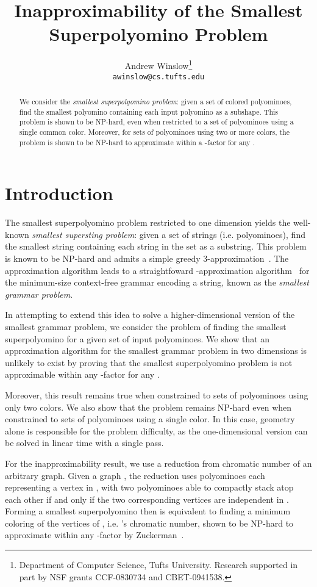 \documentclass{article}
\author{Andrew Winslow\footnote{Department of Computer Science, Tufts University. Research supported in part by NSF grants CCF-0830734 and CBET-0941538.}\\
\texttt{awinslow@cs.tufts.edu}}
\title{Inapproximability of the Smallest Superpolyomino Problem}
\date{}
\newcommand{\ccNP}{\textrm{\textsc{NP}}}
\begin{document}
\maketitle

\begin{abstract}
We consider the \emph{smallest superpolyomino problem}: given a set of colored polyominoes, find the smallest polyomino containing each input polyomino as a subshape.
This problem is shown to be \ccNP-hard, even when restricted to a set of polyominoes using a single common color.
Moreover, for sets of polyominoes using two or more colors, the problem is shown to be \ccNP-hard to approximate within a -factor for any . 
\end{abstract}

\section{Introduction}

The smallest superpolyomino problem restricted to one dimension yields the well-known \emph{smallest supersting problem}: given a set of strings (i.e.  polyominoes), find the smallest string containing each string in the set as a substring. 
This problem is known to be \ccNP-hard and admits a simple greedy 3-approximation~\cite{Blum-1994}.
The approximation algorithm leads to a straightfoward -approximation algorithm~\cite{Charikar-2005} for the minimum-size context-free grammar encoding a string, known as the \emph{smallest grammar problem}.

In attempting to extend this idea to solve a higher-dimensional version of the smallest grammar problem, we consider the problem of finding the smallest superpolyomino for a given set of input polyominoes.
We show that an approximation algorithm for the smallest grammar problem in two dimensions is unlikely to exist by proving that the smallest superpolyomino problem is not approximable within any -factor for any .

Moreover, this result remains true when constrained to sets of polyominoes using only two colors.
We also show that the problem remains \ccNP-hard even when constrained to sets of polyominoes using a single color.
In this case, geometry alone is responsible for the problem difficulty, as the one-dimensional version can be solved in linear time with a single pass.

For the inapproximability result, we use a reduction from chromatic number of an arbitrary graph.
Given a graph , the reduction uses polyominoes each representing a vertex in , with two polyominoes able to compactly stack atop each other if and only if the two corresponding vertices are independent in .
Forming a smallest superpolyomino then is equivalent to finding a minimum coloring of the vertices of , i.e. 's chromatic number, shown to be \ccNP-hard to approximate within any -factor by Zuckerman~\cite{Zuckerman-2007}.
\end{document}
